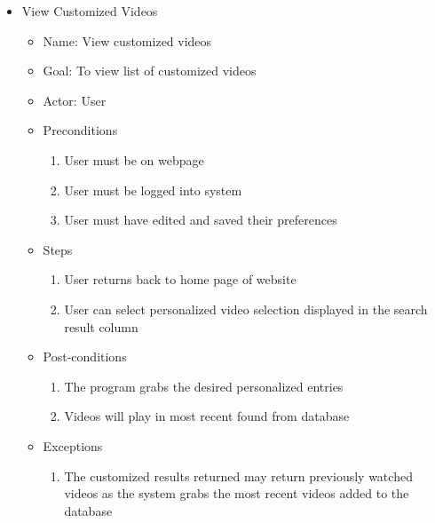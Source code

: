 \begin{itemize}
\item View Customized Videos
	\begin{itemize}
	\item Name: View customized videos 
    \item Goal: To view list of customized videos
    \item Actor: User
    \item Preconditions
		\begin{enumerate}
		\item User must be on webpage
        \item User must be logged into system
       	\item User must have edited and saved their preferences
        \end{enumerate}
    \item Steps
    	\begin{enumerate}
		\item User returns back to home page of website
        \item User can select personalized video selection displayed in the search result column 
        \end{enumerate}
    \item Post-conditions
    	\begin{enumerate}
		\item The program grabs the desired personalized entries
        \item Videos will play in most recent found from database
        \end{enumerate}
    \item Exceptions
    	\begin{enumerate}
    	\item The customized results returned may return previously watched videos as the system grabs the most recent videos added to the database
    	\end{enumerate}
    \end{itemize}
    

\end{itemize}
